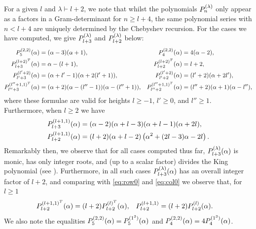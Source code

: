 \begin{remark}\label{rem:polys} 
For a given $l$ and $\lambda\vdash l+2$, we note that whilst the polynomials $P_n^{(\lambda)}$ only appear as a factors in a Gram-determinant for $n\geq l+4$, the same polynomial
series 
with $n<l+4$ are uniquely determined by the Chebyshev recursion. For the cases we have computed, we give $P_{l+3}^{(\lambda)}$ and $P_{l+2}^{(\lambda)}$ below:
\begin{align*}
    P_{5}^{(2,2)}(\alpha)&=(\alpha-3)(\alpha+1),  &P_4^{(2,2)}(\alpha)&=4 (\alpha -2), \\
    P^{(l+2)^T}_{l+3}(\alpha)&=\alpha -(l+1), &  P^{(l+2)^T}_{l+2}(\alpha)&=l+2,\\
    P^{(l'+2)}_{l'+3}(\alpha)&=(\alpha +l'-1) (\alpha +2 (l'+1) ), &  P^{(l'+2)}_{l'+2}(\alpha)&=(l'+2) (\alpha +2 l'),\\
    P^{(l''+1,1)^T}_{l''+3}(\alpha)&=(\alpha +2) (\alpha -(l''-1) ) (\alpha -(l''+1) ), &  P^{(l''+1,1)^T}_{l''+2}(\alpha)&=(l''+2)(\alpha +1) (\alpha -l'' ),\end{align*}
    where these formulae are valid for heights $l\geq -1$, $l'\geq 0$, and $l''\geq 1$. Furthermore, when $l\geq 2$ we have
\begin{align*}
    P^{(l+1,1)}_{l+3}(\alpha)&=(\alpha -2) (\alpha +l-3) (\alpha +l-1) (\alpha +2 l), \\
     P^{(l+1,1)}_{l+2}(\alpha)&=(l+2) (\alpha +l-2) \left(\alpha ^2+(2l-3) \alpha -2 l\right).
\end{align*}
 Remarkably then, we observe that for all cases computed thus far, $P_{l+3}^{(\lambda)}(\alpha)$ is monic, has only integer roots, and (up to a scalar factor) divides the King polynomial (see \cite[\S 5.1]{DeVisscherMartin2016}).  Furthermore, in all such cases $P_{l+3}^{(\lambda)}(\alpha)$ has an overall integer factor of $l+2$, and comparing with \eqref{eq:row0} and \eqref{eq:col0} we observe that, for $l\geq 1$
\begin{align*}
    P^{(l+1,1)^T}_{l+2}(\alpha)&=(l+2) P^{(l)^T}_{l+2}(\alpha), & P^{(l+1,1)}_{l+2}&=(l+2)  P^{(l)}_{l+2}(\alpha). 
\end{align*}
We also note the equalities $P^{(2,2)}_{5}(\alpha)=P^{(1^3)}_{5}(\alpha)$ and $P^{(2,2)}_{4}(\alpha)=4 P^{(1^3)}_{4}(\alpha)$.
\end{remark}



